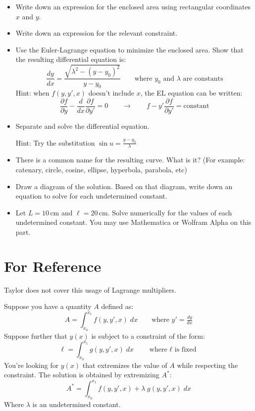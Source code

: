 \documentclass{article}
\begin{document}
\begin{itemize}
    \item Write down an expression for the enclosed area using rectangular coordinates $x$ and $y$.
    \item Write down an expression for the relevant constraint.
    \item Use the Euler-Lagrange equation to minimize the enclosed area. 
    Show that the resulting differential equation is:
    $$
    \frac{dy}{dx} = \frac{ \sqrt{ \lambda^2 - \left( y - y_0 \right)^2 } }{y - y_0}
    \quad\quad\text{where $y_0$ and $\lambda$ are constants}
    $$
    Hint: when $f(y, y', x)$ doesn't include $x$, the EL equation can be written: 
    $$
    \frac{\partial f}{\partial y} - \frac{d}{dx} \frac{\partial f}{\partial y'} = 0
    \quad\quad\rightarrow\quad\quad
    f - y' \frac{\partial f}{\partial y'} = \text{constant}
    $$
    \item Separate and solve the differential equation. 
    
    Hint: Try the substitution $\sin u = \tfrac{y - y_0}{\lambda}$
    \item There is a common name for the resulting curve. What is it? (For example: catenary, circle, cosine, ellipse, hyperbola, parabola, etc)
    \item Draw a diagram of the solution. Based on that diagram, write down an equation to solve for each undetermined constant.
    \item Let $L=10\,\text{cm}$ and $\ell=20\,\text{cm}$. Solve numerically for the values of each undetermined constant. You may use Mathematica or Wolfram Alpha on this part.
    
\end{itemize}

\newpage
\section*{For Reference}

Taylor does not cover this usage of Lagrange multipliers. 

Suppose you have a quantity $A$ defined as:
$$
A = \displaystyle\int_{x_0}^{x_1} f(y, y', x) \; dx
\quad\quad\text{where $y' = \tfrac{dy}{dx}$}
$$
Suppose further that $y(x)$ is subject to a constraint of the form:
$$
\ell = \displaystyle\int_{x_0}^{x_1} g(y, y', x) \; dx
\quad\quad\text{where $\ell$ is fixed}
$$
You're looking for $y(x)$ that extremizes the value of $A$ while respecting the constraint. The solution is obtained by extremizing $A^*$:
$$
A^* = \displaystyle\int_{x_0}^{x_1} f(y, y', x) + \lambda \; g(y, y', x) \; dx
$$
Where $\lambda$ is an undetermined constant.
\end{document}
